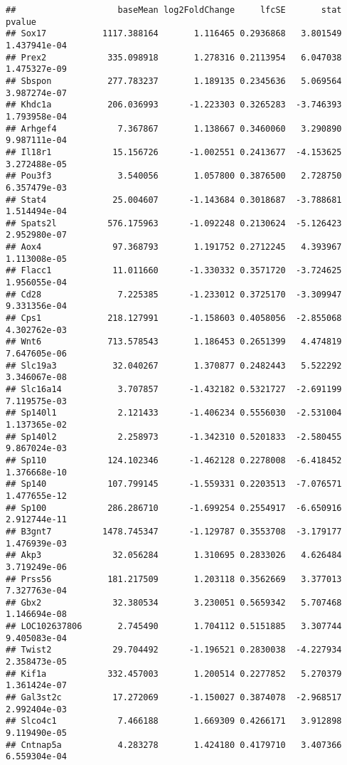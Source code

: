 \documentclass[
]{article}
\begin{document}
\begin{verbatim}
##                    baseMean log2FoldChange     lfcSE       stat       pvalue
## Sox17           1117.388164       1.116465 0.2936868   3.801549 1.437941e-04
## Prex2            335.098918       1.278316 0.2113954   6.047038 1.475327e-09
## Sbspon           277.783237       1.189135 0.2345636   5.069564 3.987274e-07
## Khdc1a           206.036993      -1.223303 0.3265283  -3.746393 1.793958e-04
## Arhgef4            7.367867       1.138667 0.3460060   3.290890 9.987111e-04
## Il18r1            15.156726      -1.002551 0.2413677  -4.153625 3.272488e-05
## Pou3f3             3.540056       1.057800 0.3876500   2.728750 6.357479e-03
## Stat4             25.004607      -1.143684 0.3018687  -3.788681 1.514494e-04
## Spats2l          576.175963      -1.092248 0.2130624  -5.126423 2.952980e-07
## Aox4              97.368793       1.191752 0.2712245   4.393967 1.113008e-05
## Flacc1            11.011660      -1.330332 0.3571720  -3.724625 1.956055e-04
## Cd28               7.225385      -1.233012 0.3725170  -3.309947 9.331356e-04
## Cps1             218.127991      -1.158603 0.4058056  -2.855068 4.302762e-03
## Wnt6             713.578543       1.186453 0.2651399   4.474819 7.647605e-06
## Slc19a3           32.040267       1.370877 0.2482443   5.522292 3.346067e-08
## Slc16a14           3.707857      -1.432182 0.5321727  -2.691199 7.119575e-03
## Sp140l1            2.121433      -1.406234 0.5556030  -2.531004 1.137365e-02
## Sp140l2            2.258973      -1.342310 0.5201833  -2.580455 9.867024e-03
## Sp110            124.102346      -1.462128 0.2278008  -6.418452 1.376668e-10
## Sp140            107.799145      -1.559331 0.2203513  -7.076571 1.477655e-12
## Sp100            286.286710      -1.699254 0.2554917  -6.650916 2.912744e-11
## B3gnt7          1478.745347      -1.129787 0.3553708  -3.179177 1.476939e-03
## Akp3              32.056284       1.310695 0.2833026   4.626484 3.719249e-06
## Prss56           181.217509       1.203118 0.3562669   3.377013 7.327763e-04
## Gbx2              32.380534       3.230051 0.5659342   5.707468 1.146694e-08
## LOC102637806       2.745490       1.704112 0.5151885   3.307744 9.405083e-04
## Twist2            29.704492      -1.196521 0.2830038  -4.227934 2.358473e-05
## Kif1a            332.457003       1.200514 0.2277852   5.270379 1.361424e-07
## Gal3st2c          17.272069      -1.150027 0.3874078  -2.968517 2.992404e-03
## Slco4c1            7.466188       1.669309 0.4266171   3.912898 9.119490e-05
## Cntnap5a           4.283278       1.424180 0.4179710   3.407366 6.559304e-04

\end{verbatim}
\end{document}
